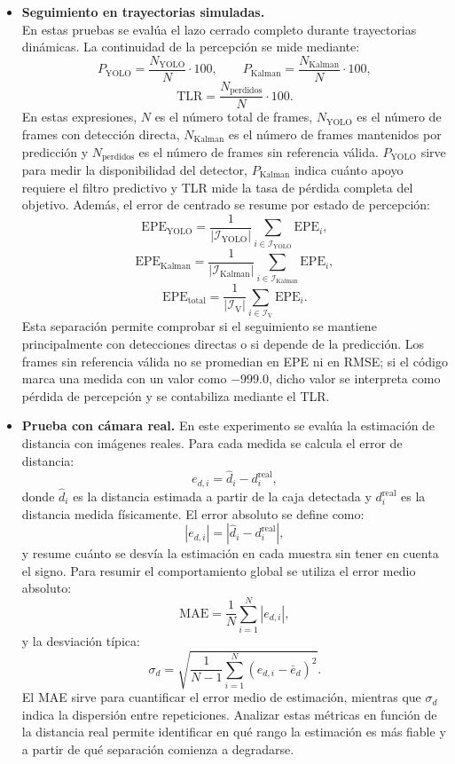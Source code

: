\begin{itemize}
    \item \textbf{Seguimiento en trayectorias simuladas.}\\ En estas pruebas se evalúa el lazo cerrado completo durante trayectorias dinámicas. La continuidad de la percepción se mide mediante:
    \[
    P_{\mathrm{YOLO}}=\frac{N_{\mathrm{YOLO}}}{N}\cdot100, \qquad P_{\mathrm{Kalman}}=\frac{N_{\mathrm{Kalman}}}{N}\cdot100,
    \]
    \[
    \mathrm{TLR}=\frac{N_{\mathrm{perdidos}}}{N}\cdot100.
    \]
    En estas expresiones, $N$ es el número total de frames, $N_{\mathrm{YOLO}}$ es el número de frames con detección directa, $N_{\mathrm{Kalman}}$ es el número de frames mantenidos por predicción y $N_{\mathrm{perdidos}}$ es el número de frames sin referencia válida. $P_{\mathrm{YOLO}}$ sirve para medir la disponibilidad del detector, $P_{\mathrm{Kalman}}$ indica cuánto apoyo requiere el filtro predictivo y TLR mide la tasa de pérdida completa del objetivo. Además, el error de centrado se resume por estado de percepción:
    \[
    \mathrm{EPE}_{\mathrm{YOLO}}=\frac{1}{|\mathcal{I}_{\mathrm{YOLO}}|}\sum_{i\in\mathcal{I}_{\mathrm{YOLO}}}\mathrm{EPE}_i,
    \]
    \[
    \mathrm{EPE}_{\mathrm{Kalman}}=\frac{1}{|\mathcal{I}_{\mathrm{Kalman}}|}\sum_{i\in\mathcal{I}_{\mathrm{Kalman}}}\mathrm{EPE}_i,
    \]
    \[
    \mathrm{EPE}_{\mathrm{total}}=\frac{1}{|\mathcal{I}_{\mathrm{V}}|}\sum_{i\in\mathcal{I}_{\mathrm{V}}}\mathrm{EPE}_i.
    \]
    Esta separación permite comprobar si el seguimiento se mantiene principalmente con detecciones directas o si depende de la predicción. Los frames sin referencia válida no se promedian en EPE ni en RMSE; si el código marca una medida con un valor como $-999.0$, dicho valor se interpreta como pérdida de percepción y se contabiliza mediante el TLR.

    \item \textbf{Prueba con cámara real.} En este experimento se evalúa la estimación de distancia con imágenes reales. Para cada medida se calcula el error de distancia:
    \[
    e_{d,i}=\hat{d}_i-d^{\mathrm{real}}_i,
    \]
    donde $\hat{d}_i$ es la distancia estimada a partir de la caja detectada y $d^{\mathrm{real}}_i$ es la distancia medida físicamente. El error absoluto se define como:
    \[
    |e_{d,i}|=|\hat{d}_i-d^{\mathrm{real}}_i|,
    \]
    y resume cuánto se desvía la estimación en cada muestra sin tener en cuenta el signo. Para resumir el comportamiento global se utiliza el error medio absoluto:
    \[
    \mathrm{MAE}=\frac{1}{N}\sum_{i=1}^{N}|e_{d,i}|,
    \]
    y la desviación típica:
    \[
    \sigma_d=\sqrt{\frac{1}{N-1}\sum_{i=1}^{N}(e_{d,i}-\bar{e}_d)^2}.
    \]
    El MAE sirve para cuantificar el error medio de estimación, mientras que $\sigma_d$ indica la dispersión entre repeticiones. Analizar estas métricas en función de la distancia real permite identificar en qué rango la estimación es más fiable y a partir de qué separación comienza a degradarse.
\end{itemize}


